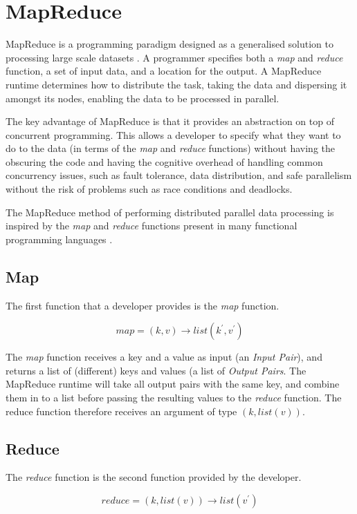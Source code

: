 \section{MapReduce}
MapReduce is a programming paradigm designed as a generalised solution to processing large scale datasets \cite{dean2004mapreduce}. A programmer specifies both a \textit{map} and \textit{reduce} function, a set of input data, and a location for the output. A MapReduce runtime  determines how to distribute the task, taking the data and dispersing it amongst its nodes, enabling the data to be processed in parallel.

The key advantage of MapReduce is that it provides an abstraction on top of concurrent programming. This allows a developer to specify what they want to do to the data (in terms of the \textit{map} and \textit{reduce} functions) without having the obscuring the code and having the cognitive overhead of handling common concurrency issues, such as fault tolerance, data distribution, and safe parallelism without the risk of problems such as race conditions and deadlocks. 

The MapReduce method of performing distributed parallel data processing is inspired by the \textit{map} and \textit{reduce} functions present in many functional programming languages \cite{dean2004mapreduce}. 

\subsection{Map}
The first function that a developer provides is the \textit{map} function.

$$ map = (k, v) \rightarrow list(k^{\prime}, v^{\prime}) $$

The \textit{map} function receives a key and a value as input (an \textit{Input Pair}), and returns a list of (different) keys and values (a list of \textit{Output Pairs}. The MapReduce runtime will take all output pairs with the same key, and combine them in to a list before passing the resulting values to the \textit{reduce} function. The reduce function therefore receives an argument of type $ (k, list(v)) $.

\subsection{Reduce}
The \textit{reduce} function is the second function provided by the developer. 

$$ reduce = (k, list(v)) \rightarrow list(v^{\prime}) $$


